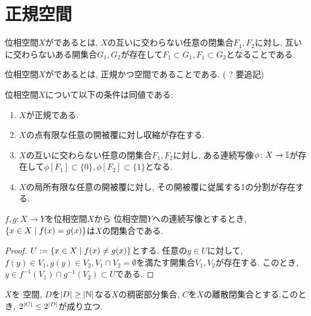 \documentclass[uplatex, dvipdfmx, a4paper, 12pt, class=jsbook, crop=false]{standalone}
\begin{document}
\section{正規空間}
\label{sec:normal-spaces}

\begin{definition}
	位相空間$ X $がであるとは, $ X $の互いに交わらない任意の閉集合$ F_1, F_2 $に対し, 互いに交わらないある開集合$ G_1, G_2 $が存在して$ F_1 \subset G_1, F_1 \subset G_2 $となることである.
\end{definition}

\begin{definition}
	位相空間$ X $がであるとは, 正規かつ空間であることである. ( ? 要追記)
\end{definition}

\begin{theorem}
	位相空間$ X $について以下の条件は同値である:
	\begin{enumerate}
		\item $ X $が正規である.
		\item $ X $の点有限な任意の開被覆に対し収縮が存在する.
		\item $ X $の互いに交わらない任意の閉集合$ F_1, F_2 $に対し, ある連続写像$ \phi \colon X \rightarrow \mathbb{I} $が存在して$ \phi[F_1] \subset \{0\}, \phi[F_2] \subset \{1\} $となる.
		\item $ X $の局所有限な任意の開被覆に対し, その開被覆に従属する1の分割が存在する.
	\end{enumerate}
\end{theorem}

\begin{lemma}
	\label{lem:Let X and Y are top.sp, Y is T2, f,g : X to Y are conti, then the set defined as {x in X | f(x) = g(x)} is closed.}
	$f, g \colon X \to Y $を位相空間$ X $から  位相空間$ Y $への連続写像とするとき, $ \setcomp{x \in X}{f(x) = g(x)} $は$ X $の閉集合である.
\end{lemma}

\begin{proof}
	$ U \defeq \setcomp{x \in X}{f(x) \neq g(x)} $とする. 任意の$ y \in U $に対して, $ f(y) \in V_1, g(y) \in V_2, V_1 \cap V_2 = \emptyset $を満たす開集合$ V_1, V_2 $が存在する. このとき, $ y \in f^{-1}(V_1) \cap g^{-1}(V_2) \subset U $である.
\end{proof}

\begin{theorem}
	\label{thm:Jone's Lemma}
	$ X $を  空間, $ D $を$ \left|D\right| \geq \left|\mathbb{N}\right| $なる$ X $の稠密部分集合, $ C $を$ X $の離散閉集合とする.このとき, $2^{\left|C\right|} \leq 2^{\left|D\right|} $が成り立つ.
\end{theorem}
\end{document}
